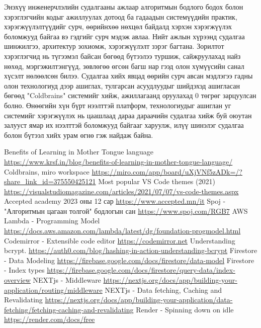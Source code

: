 \documentclass[12pt,A4]{report}
\begin{document}
Энэхүү инженерчлэлийн судалгааны ажлаар алгоритмын бодлого бодох болон хэрэглэгчийн кодыг ажиллуулах дотоод ба гадаадын системүүдийн практик, хэрэгжүүлэлтүүдийг сурч, өөрийнхөө нөхцөл байдалд хэрхэн хэрэгжүүлэх боломжууд байгаа вэ гэдгийг сурч мэдэж авлаа. Нийт ажлын хүрээнд судалгаа шинжилгээ, архитектур зохиомж, хэрэгжүүлэлт зэрэг багтана. Зорилтот хэрэглэгчид нь түгээмэл байсан бөгөөд бүтээлээ туршиж, сайжруулахад найз нөхөд, мэргэжилтэнгүүд, зөвлөгөө өгсөн багш нар гээд олон хүмүүсийн санал хүсэлт нөлөөлсөн билээ. Судалгаа хийх явцад өөрийн сурч авсан мэдлэгээ гадны олон технологиуд дээр ашиглах, тулгарсан асуудлуудыг шийдэхэд ашигласан бөгөөд "Coldbrains" системийг хийж, ажиллагаанд оруулахад 0 төгрөг зарцуулсан болно. Өнөөгийн хүн бүрт нээлттэй платформ, технологиудыг ашиглан уг системийг хэрэгжүүлэх нь цаашлаад дараа дараачийн судалгаа хийж буй оюутан залууст ямар их нээлттэй боломжууд байгааг харуулж, илүү шинэлэг судалгаа болон бүтээл хийх урам өгнө гэж найдаж байна. 


\singlespace
{}
\begin{thebibliography}{}
    Benefits of Learning in Mother Tongue language \url{https://www.krsf.in/blog/benefits-of-learning-in-mother-tongue-language/}
    Coldbrains, miro workspace \url{https://miro.com/app/board/uXjVNf5zADk=/?share_link_id=375550425121}
    Most popular VS Code themes (2021) \url{https://visualstudiomagazine.com/articles/2021/07/07/vs-code-themes.aspx}
    Accepted academy 2023 оны 12 сар \url{https://www.accepted.mn/it}
    Spoj - "Алгоритмын цагаан толгой" бодлогын сан \url{https://www.spoj.com/RGB7}
    AWS Lambda - Programming Model \url{https://docs.aws.amazon.com/lambda/latest/dg/foundation-progmodel.html}
    Codemirror - Extensible code editor \url{https://codemirror.net}
    Understanding bcrypt. \url{https://auth0.com/blog/hashing-in-action-understanding-bcrypt}
    Firestore - Data Modeling \url{https://firebase.google.com/docs/firestore/data-model}
    Firestore - Index types \url{https://firebase.google.com/docs/firestore/query-data/index-overview}
    NEXTjs - Middleware \url{https://nextjs.org/docs/app/building-your-application/routing/middleware}
    NEXTjs - Data fetching, Caching and Revalidating \url{https://nextjs.org/docs/app/building-your-application/data-fetching/fetching-caching-and-revalidating}
    Render - Spinning down on idle \url{https://render.com/docs/free}
\end{thebibliography}
\end{document}
